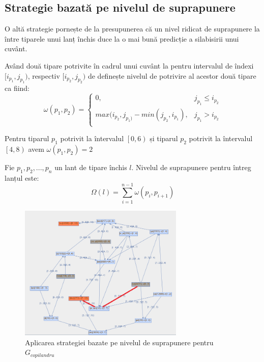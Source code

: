 \subsection{Strategie bazată pe nivelul de suprapunere}

O altă strategie pornește de la presupunerea că un nivel ridicat de suprapunere la între tiparele unui lanț închis duce la o mai bună predicție a silabisirii unui cuvânt.

\begin{defi}
Având două tipare potrivite în cadrul unui cuvânt la pentru intervalul de îndexi $[i_{p_1}, j_{p_1})$, respectiv $[i_{p_2}, j_{p_2})$ de definește nivelul de potrivire al acestor două tipare ca fiind:
\begin{equation}
\omega(p_1, p_2) = \left\{
\begin{matrix}
0, 					& j_{p_1} \leq i_{p_2}\\ 
max(i_{p_2},j_{p_1)} - min(j_{p_2},i_{p_1}),	& j_{p_1} > i_{p_2} \\
\end{matrix}
\right.
\end{equation}
\end{defi}

\begin{ex}
Pentru tiparul $p_1$ potrivit la întervalul $\left[0, 6\right)$ și tiparul $p_2$ potrivit la întervalul $\left[4, 8\right)$ avem $ \omega(p_1,p_2)=2$
\end{ex}

\begin{defi}
Fie $p_1, p_2, ..., p_n$ un lant de tipare închis $l$. Nivelul de suprapunere pentru întreg lanțul este:
\begin{equation}
\Omega(l) = \sum_{i=1}^{n-1}{ \omega(p_i, p_{i+1})}
\end{equation}
\end{defi}

\begin{figure}[h!]
    \centering
    \includegraphics[width=0.7\textwidth]{figures/rosil-overlapping.png}
    \caption{Aplicarea strategiei bazate pe nivelul de suprapunere pentru $G_{copilandru}$}
    \label{fig:rosil-overlapping}
\end{figure}

